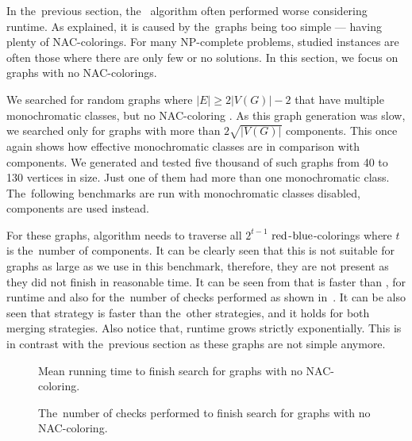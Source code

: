In the~previous section, the~\Subgraphs{} algorithm
often performed worse considering runtime.
As explained, it is caused by the~graphs being too simple
--- having plenty of NAC-colorings.
%
For many NP-complete problems, studied instances are often
those where there are only few or no solutions.
In this section, we focus on graphs with no NAC-colorings.

We searched for random graphs where \( |E| \ge 2|V(G)| - 2 \) that have
multiple monochromatic classes, but no NAC-coloring%
.
%
As this graph generation was slow, we searched only for
graphs with more than \( 2\sqrt{|V(G)|} \) \trcon{} components.
%
This once again shows how effective monochromatic classes are
in comparison with \trcon{} components.
We generated and tested five thousand of such graphs from 40 to 130 vertices in size.
Just one of them had more than one monochromatic class.
%
The~following benchmarks are run with monochromatic classes disabled,
\trcon{} components are used instead.

For these graphs, \NaiveCycles{} algorithm needs to traverse all \( 2^{t-1} \) \(\text{red}\)-\(\text{blue}\)-colorings
where \( t \) is the~number of \trcon{} components. It can be clearly seen that
this is not suitable for graphs as large as we use in this benchmark,
therefore, they are not present as they did not finish in reasonable time.
It can be seen from 
that \SharedVertices{} is faster than \MergeLinear{},
for runtime and also for the~number of checks performed
as shown in~.
%
It can be also seen that \NeighborsDegree{} strategy is
faster than the~other strategies, and it holds for both merging strategies.
Also notice that,
runtime grows strictly exponentially.
This is in contrast with the~previous section
as these graphs are not simple anymore.

\begin{figure}[thbp]
	\centering
	\scalebox{\BenchFigureScale}{}
	\caption[Mean runtime for graphs with no NAC-coloring]{
		Mean running time to finish search for graphs with no NAC-coloring.}%
	\label{fig:graph_no_nac_coloring_first_runtime}
\end{figure}%
\begin{figure}[thbp]
	\centering
	\scalebox{\BenchFigureScale}{}
	\caption[Checks performed for graphs with no NAC-coloring]{
		The~number of checks performed to finish search for graphs with no NAC-coloring.}%
	\label{fig:graph_no_nac_coloring_first_checks}
\end{figure}%

